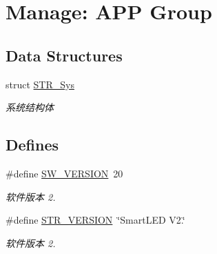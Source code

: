 \hypertarget{group___m_a_n_a_g_e}{\section{\-Manage\-: \-A\-P\-P \-Group}
\label{group___m_a_n_a_g_e}
}
\subsection*{\-Data \-Structures}
\begin{DoxyCompactItemize}
\item 
struct \hyperlink{struct_s_t_r___sys}{\-S\-T\-R\-\_\-\-Sys}
\begin{DoxyCompactList}\small\item\em 系统结构体 \end{DoxyCompactList}\end{DoxyCompactItemize}
\subsection*{\-Defines}
\begin{DoxyCompactItemize}
\item 
\hypertarget{group___m_a_n_a_g_e_gad13f8dea3a5243219cd2109520fdefe4}{\#define \hyperlink{group___m_a_n_a_g_e_gad13f8dea3a5243219cd2109520fdefe4}{\-S\-W\-\_\-\-V\-E\-R\-S\-I\-O\-N}~20}\label{group___m_a_n_a_g_e_gad13f8dea3a5243219cd2109520fdefe4}

\begin{DoxyCompactList}\small\item\em 软件版本 2. \end{DoxyCompactList}\item 
\hypertarget{group___m_a_n_a_g_e_ga8c5f6d47006c226d1cc5c20bac6ecf76}{\#define \hyperlink{group___m_a_n_a_g_e_ga8c5f6d47006c226d1cc5c20bac6ecf76}{\-S\-T\-R\-\_\-\-V\-E\-R\-S\-I\-O\-N}~\char`\"{}\-Smart\-L\-E\-D \-V2.\char`\"{}}\label{group___m_a_n_a_g_e_ga8c5f6d47006c226d1cc5c20bac6ecf76}

\begin{DoxyCompactList}\small\item\em 软件版本 2. \end{DoxyCompactList}\end{DoxyCompactItemize}
